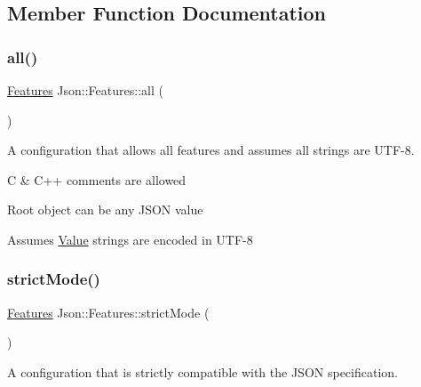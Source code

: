 \subsection{Member Function Documentation}
\mbox{\label{class_json_1_1_features_a63894da6e2c100b38741fa933f3d33ae}} 
\subsubsection{\texorpdfstring{all()}{all()}}
{\footnotesize\ttfamily \hyperlink{class_json_1_1_features}{Features} Json\+::\+Features\+::all (\begin{DoxyParamCaption}{ }\end{DoxyParamCaption})\hspace{0.3cm}{\ttfamily [static]}}



A configuration that allows all features and assumes all strings are U\+T\+F-\/8. 


\begin{DoxyItemize}
\item C \& C++ comments are allowed
\item Root object can be any J\+S\+ON value
\item Assumes \hyperlink{class_json_1_1_value}{Value} strings are encoded in U\+T\+F-\/8 
\end{DoxyItemize}\mbox{\label{class_json_1_1_features_ae23176c14b2e79e81fb61fb1a8ab58ee}} 
\subsubsection{\texorpdfstring{strict\+Mode()}{strictMode()}}
{\footnotesize\ttfamily \hyperlink{class_json_1_1_features}{Features} Json\+::\+Features\+::strict\+Mode (\begin{DoxyParamCaption}{ }\end{DoxyParamCaption})\hspace{0.3cm}{\ttfamily [static]}}



A configuration that is strictly compatible with the J\+S\+ON specification. 


